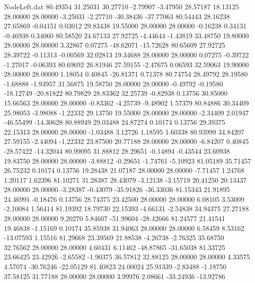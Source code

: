 \begin{filecontents}{NodeLeft.dat}
  80.49354   31.25031   30.27710    -2.79907   -3.47950   28.57187   18.13125   28.00000   28.00000   -3.25031   -2.27710  -30.38436  -37.77063
  80.54443   28.16238   27.65869    -0.04151    0.03012   29.83438   19.55000   28.00000   28.00000   -0.16238    0.34131   -0.46938    0.34060
  80.58520   24.67133   27.92725    -4.44644   -1.43819   33.48750   19.80000   28.00000   28.00000    3.32867    0.07275  -48.62071  -15.72628
  80.65609   27.92725   28.39722    -0.11313   -0.00569   32.02813   19.34688   28.00000   28.00000    0.07275   -0.39722   -1.27017   -0.06393
  80.69692   26.81946   27.59155    -2.47675    0.06593   32.59063   19.90000   28.00000   28.00000    1.18054    0.40845  -26.81371    0.71378
  80.74754   28.49792   28.19580    -1.68888   -1.93957   31.56875   19.58750   28.00000   28.00000   -0.49792   -0.19580  -18.12749  -20.81822
  80.79829   28.83362   32.25739    -0.82938    0.13756   30.85000   15.66563   28.00000   28.00000   -0.83362   -4.25739   -9.48902    1.57379
  80.84886   30.34409   25.98053    -3.98088   -1.22332   29.13750   19.55000   28.00000   28.00000   -2.34409    2.01947  -46.55499  -14.30628
  80.88949   29.03488   24.87274     0.10174    0.13756   29.39375   22.15313   28.00000   28.00000   -1.03488    3.12726    1.18595    1.60338
  80.93999   34.84207   27.59155    -2.44094   -1.22332   23.87500   20.77188   28.00000   28.00000   -6.84207    0.40845  -28.57422  -14.32044
  80.99095   31.88812   28.29651    -0.14894   -0.43544   23.60938   19.83750   28.00000   28.00000   -3.88812   -0.29651   -1.74761   -5.10923
  81.05189   35.71457   26.75232     0.10174    0.13756   19.28438   21.07187   28.00000   28.00000   -7.71457    1.24768    1.20117    1.62396
  81.10271   31.28387   28.43079    -3.12138   -3.15719   20.41250   20.13437   28.00000   28.00000   -3.28387   -0.43079  -35.91826  -36.33036
  81.15343   21.91895   24.46991    -0.18476    0.13756   28.74375   23.42500   28.00000   28.00000    6.08105    3.53009   -2.10084    1.56414
  81.19392   18.79730   22.15393    -4.66131   -2.54838   34.94375   27.27188   28.00000   28.00000    9.20270    5.84607  -51.99604  -28.42666
  81.24577   21.41541   19.46838    -1.15169    0.10174   35.85938   31.94063   28.00000   28.00000    6.58459    8.53162  -13.07593    1.15516
  81.29668   23.39569   21.88538    -4.26738   -2.76325   35.68750   32.76562   28.00000   28.00000    4.60431    6.11462  -48.87865  -31.65038
  81.33725   23.66425   23.42926    -2.65582   -1.90375   36.57812   32.88125   28.00000   28.00000    4.33575    4.57074  -30.76246  -22.05129
  81.40823   24.00024   25.91339    -2.83488   -1.18750   37.58125   31.77188   28.00000   28.00000    3.99976    2.08661  -33.24936  -13.92786

\end{filecontents}
